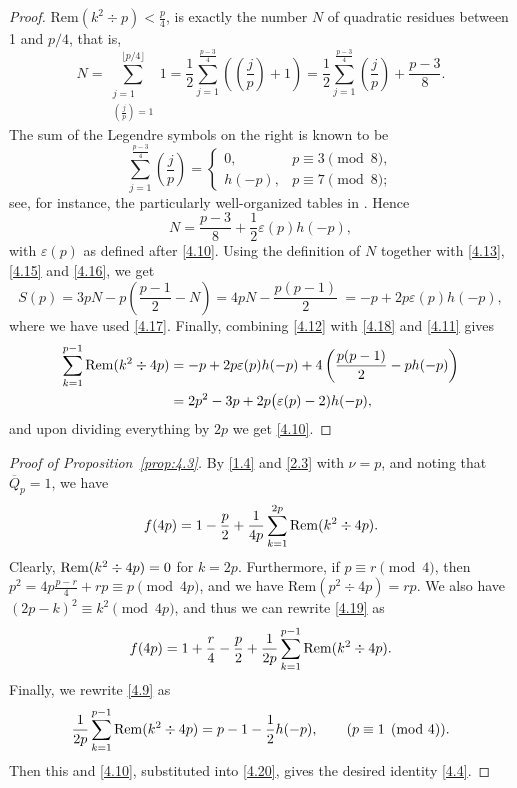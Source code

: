 \documentclass{amsart}
\theoremstyle{plain}
\numberwithin{equation}{section}
\begin{document}
\begin{proof}
Rem$(k^2\div p)<\frac{p}{4}$, is exactly the number $N$ of quadratic residues
between 1 and $p/4$, that is, 
\[
N=\sum_{\substack{j=1\\(\frac{j}{p})=1}}^{\lfloor p/4\rfloor}1
=\frac{1}{2}\sum_{j=1}^{\frac{p-3}{4}}\left(\left(\frac{j}{p}\right)+1\right)
=\frac{1}{2}\sum_{j=1}^{\frac{p-3}{4}}\left(\frac{j}{p}\right)
+\frac{p-3}{8}.
\]
The sum of the Legendre symbols on the right is known to be
\[
\sum_{j=1}^{\frac{p-3}{4}}\left(\frac{j}{p}\right) = \begin{cases}
0,& p\equiv 3\pmod{8},\\
h(-p),& p\equiv 7\pmod{8};
\end{cases}
\]
see, for instance, the particularly well-organized tables in \cite{JM}. Hence
\begin{equation}\label{4.17}
N=\frac{p-3}{8}+\frac{1}{2}\varepsilon(p)h(-p), 
\end{equation}
with $\varepsilon(p)$ as defined after \eqref{4.10}. Using the definition of
$N$ together with \eqref{4.13}, \eqref{4.15} and \eqref{4.16}, we get
\begin{equation}\label{4.18}
S(p) = 3pN-p\left(\frac{p-1}{2}-N\right) = 4pN-\frac{p(p-1)}{2}\
= -p+2p\varepsilon(p)h(-p),
\end{equation}
where we have used \eqref{4.17}. Finally, combining \eqref{4.12} with 
\eqref{4.18} and \eqref{4.11} gives
\begin{align*}
\sum_{k=1}^{p-1}{\rm Rem}(k^2\div 4p)
&= -p+2p\varepsilon(p)h(-p)+4\left(\frac{p(p-1)}{2}-ph(-p)\right)\\
&= 2p^2-3p+2p\big(\varepsilon(p)-2)h(-p),
\end{align*}
and upon dividing everything by $2p$ we get \eqref{4.10}.
\end{proof}

\begin{proof}[Proof of Proposition~\ref{prop:4.3}]
By \eqref{1.4} and \eqref{2.3} with $\nu=p$, and noting that 
$\overline{Q}_p=1$, we have
\begin{equation}\label{4.19}
f(4p)=1-\frac{p}{2}+\frac{1}{4p}\sum_{k=1}^{2p}{\rm Rem}(k^2\div 4p).
\end{equation}
Clearly, ${\rm Rem}(k^2\div 4p)=0$ for $k=2p$. Furthermore, if 
$p\equiv r\pmod{4}$, then 
$p^2=4p\frac{p-r}{4}+rp\equiv p\pmod{4p}$, and we have Rem$(p^2\div 4p)=rp$. We
also have $(2p-k)^2\equiv k^2\pmod{4p}$, and thus we can rewrite \eqref{4.19} as
\begin{equation}\label{4.20}
f(4p)=1+\frac{r}{4}-\frac{p}{2}
+\frac{1}{2p}\sum_{k=1}^{p-1}{\rm Rem}(k^2\div 4p).
\end{equation}
Finally, we rewrite \eqref{4.9} as
\[
\frac{1}{2p}\sum_{k=1}^{p-1}{\rm Rem}(k^2\div 4p) = p-1-\frac{1}{2}h(-p),
\qquad (p\equiv 1\pmod{4}).
\]
Then this and \eqref{4.10}, substituted into \eqref{4.20}, gives the desired 
identity \eqref{4.4}.
\end{proof}
\end{document}

